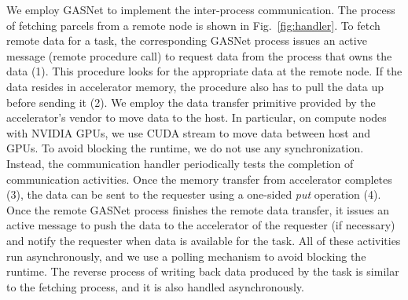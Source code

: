We employ GASNet to implement the inter-process communication.
The process of fetching parcels from a remote node is shown in Fig.~\ref{fig:handler}.
To fetch remote data for a task, the corresponding GASNet process issues an active message (remote procedure call) to request data from the process that owns the data (1).
This procedure looks for the appropriate data at the remote node.
If the data resides in accelerator memory, the procedure also has to pull the data up before sending it (2).
We employ the data transfer primitive provided by the accelerator's vendor to move data to the host.
In particular, on compute nodes with NVIDIA GPUs, we use CUDA stream to move data between host and GPUs.
To avoid blocking the runtime, we do not use any synchronization.
Instead, the communication handler periodically tests the completion of communication activities.
Once the memory transfer from accelerator completes (3), the data can be sent to the requester using a one-sided {\em put} operation (4).
Once the remote GASNet process finishes the remote data transfer, it issues an active message to push the data to the accelerator of the requester (if necessary) and notify the requester when data is available for the task.
All of these activities run asynchronously, and we use a polling mechanism to avoid blocking the runtime.
The reverse process of writing back data produced by the task is similar to the fetching process, and it is also handled asynchronously.





